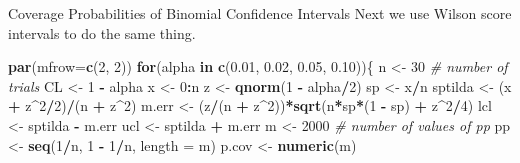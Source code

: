 \documentclass[
  ignorenonframetext,
]{beamer}
\newenvironment{Shaded}{\begin{snugshade}}{\end{snugshade}}
\newcommand{\AttributeTok}[1]{\textcolor[rgb]{0.13,0.29,0.53}{#1}}
\newcommand{\CommentTok}[1]{\textcolor[rgb]{0.56,0.35,0.01}{\textit{#1}}}
\newcommand{\ControlFlowTok}[1]{\textcolor[rgb]{0.13,0.29,0.53}{\textbf{#1}}}
\newcommand{\DecValTok}[1]{\textcolor[rgb]{0.00,0.00,0.81}{#1}}
\newcommand{\FloatTok}[1]{\textcolor[rgb]{0.00,0.00,0.81}{#1}}
\newcommand{\FunctionTok}[1]{\textcolor[rgb]{0.13,0.29,0.53}{\textbf{#1}}}
\newcommand{\NormalTok}[1]{#1}
\newcommand{\OtherTok}[1]{\textcolor[rgb]{0.56,0.35,0.01}{#1}}
\newcommand{\SpecialCharTok}[1]{\textcolor[rgb]{0.81,0.36,0.00}{\textbf{#1}}}
\begin{document}
\begin{frame}[fragile]{Coverage Probabilities of Binomial Confidence
Intervals}
\protect\hypertarget{coverage-probabilities-of-binomial-confidence-intervals-9}{}
Next we use Wilson score intervals to do the same thing.

\tiny

\begin{Shaded}
\begin{Highlighting}[]
\FunctionTok{par}\NormalTok{(}\AttributeTok{mfrow=}\FunctionTok{c}\NormalTok{(}\DecValTok{2}\NormalTok{, }\DecValTok{2}\NormalTok{))}
\ControlFlowTok{for}\NormalTok{(alpha }\ControlFlowTok{in} \FunctionTok{c}\NormalTok{(}\FloatTok{0.01}\NormalTok{, }\FloatTok{0.02}\NormalTok{, }\FloatTok{0.05}\NormalTok{, }\FloatTok{0.10}\NormalTok{))\{}
\NormalTok{n }\OtherTok{\textless{}{-}} \DecValTok{30}     \CommentTok{\# number of trials}
\NormalTok{CL }\OtherTok{\textless{}{-}} \DecValTok{1} \SpecialCharTok{{-}}\NormalTok{ alpha}
\NormalTok{x }\OtherTok{\textless{}{-}} \DecValTok{0}\SpecialCharTok{:}\NormalTok{n }
\NormalTok{z }\OtherTok{\textless{}{-}} \FunctionTok{qnorm}\NormalTok{(}\DecValTok{1} \SpecialCharTok{{-}}\NormalTok{ alpha}\SpecialCharTok{/}\DecValTok{2}\NormalTok{)}
\NormalTok{sp }\OtherTok{\textless{}{-}}\NormalTok{ x}\SpecialCharTok{/}\NormalTok{n}
\NormalTok{sptilda }\OtherTok{\textless{}{-}}\NormalTok{ (x }\SpecialCharTok{+}\NormalTok{ z}\SpecialCharTok{\^{}}\DecValTok{2}\SpecialCharTok{/}\DecValTok{2}\NormalTok{)}\SpecialCharTok{/}\NormalTok{(n }\SpecialCharTok{+}\NormalTok{ z}\SpecialCharTok{\^{}}\DecValTok{2}\NormalTok{)}
\NormalTok{m.err }\OtherTok{\textless{}{-}}\NormalTok{ (z}\SpecialCharTok{/}\NormalTok{(n }\SpecialCharTok{+}\NormalTok{ z}\SpecialCharTok{\^{}}\DecValTok{2}\NormalTok{))}\SpecialCharTok{*}\FunctionTok{sqrt}\NormalTok{(n}\SpecialCharTok{*}\NormalTok{sp}\SpecialCharTok{*}\NormalTok{(}\DecValTok{1} \SpecialCharTok{{-}}\NormalTok{ sp) }\SpecialCharTok{+}\NormalTok{ z}\SpecialCharTok{\^{}}\DecValTok{2}\SpecialCharTok{/}\DecValTok{4}\NormalTok{)}
\NormalTok{lcl }\OtherTok{\textless{}{-}}\NormalTok{ sptilda }\SpecialCharTok{{-}}\NormalTok{ m.err}
\NormalTok{ucl }\OtherTok{\textless{}{-}}\NormalTok{ sptilda }\SpecialCharTok{+}\NormalTok{ m.err}
\NormalTok{m }\OtherTok{\textless{}{-}} \DecValTok{2000} \CommentTok{\# number of values of pp}
\NormalTok{pp }\OtherTok{\textless{}{-}} \FunctionTok{seq}\NormalTok{(}\DecValTok{1}\SpecialCharTok{/}\NormalTok{n, }\DecValTok{1} \SpecialCharTok{{-}} \DecValTok{1}\SpecialCharTok{/}\NormalTok{n, }\AttributeTok{length =}\NormalTok{ m)}
\NormalTok{p.cov }\OtherTok{\textless{}{-}} \FunctionTok{numeric}\NormalTok{(m)}

\end{Highlighting}
\end{Shaded}
\end{frame}
\end{document}
